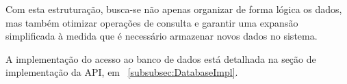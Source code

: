 Com esta estruturação, busca-se não apenas organizar de forma lógica os dados, mas também otimizar operações de consulta e garantir uma expansão simplificada à medida que é necessário armazenar novos dados no sistema.

A implementação do acesso ao banco de dados está detalhada na seção de implementação da \gls{API}, em ~\ref{subsubsec:DatabaseImpl}.


